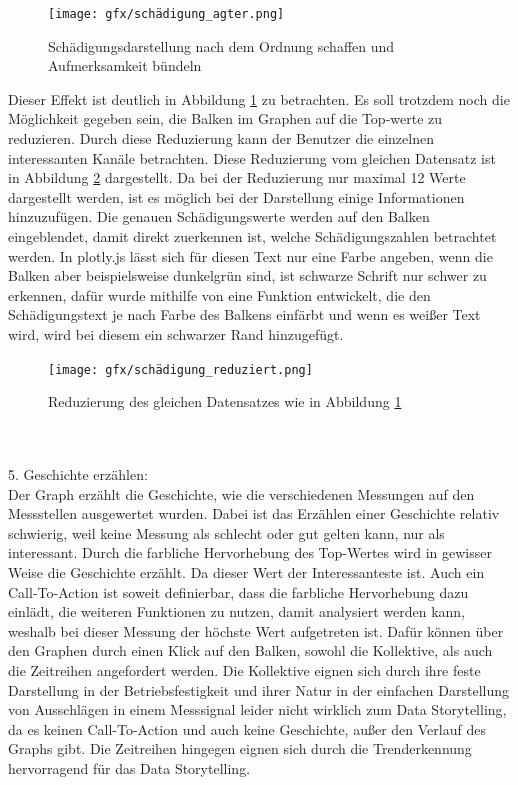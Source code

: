 \begin{figure}[!h]
    \centering
    \texttt{[image: gfx/schädigung\_agter.png]}
    \caption{Schädigungsdarstellung nach dem Ordnung schaffen und Aufmerksamkeit bündeln}
    \label{fig:schaedigung_after}
\end{figure}
\noindent
Dieser Effekt ist deutlich in Abbildung \ref{fig:schaedigung_after} zu betrachten. Es soll trotzdem noch die Möglichkeit gegeben sein, die Balken im Graphen auf die Top-werte zu reduzieren. Durch diese Reduzierung kann der Benutzer die einzelnen interessanten Kanäle betrachten. Diese Reduzierung vom gleichen Datensatz ist in Abbildung \ref{fig:schädigung_reduziert} dargestellt. Da bei der Reduzierung nur maximal 12 Werte dargestellt werden, ist es möglich bei der Darstellung einige Informationen hinzuzufügen. Die genauen Schädigungswerte werden auf den Balken eingeblendet, damit direkt zuerkennen ist, welche Schädigungszahlen betrachtet werden. In plotly.js lässt sich für diesen Text nur eine Farbe angeben, wenn die Balken aber beispielsweise dunkelgrün sind, ist schwarze Schrift nur schwer zu erkennen, dafür wurde mithilfe von \cite{Alnitak.2012} eine Funktion entwickelt, die den Schädigungstext je nach Farbe des Balkens einfärbt und wenn es weißer Text wird, wird bei diesem ein schwarzer Rand hinzugefügt.
\begin{figure}[!h]
    \centering
    \texttt{[image: gfx/schädigung\_reduziert.png]}
    \caption{Reduzierung des gleichen Datensatzes wie in Abbildung \ref{fig:schaedigung_after}}
    \label{fig:schädigung_reduziert}
\end{figure}
\\\\5. Geschichte erzählen:\\
Der Graph erzählt die Geschichte, wie die verschiedenen Messungen auf den Messstellen ausgewertet wurden. Dabei ist das Erzählen einer Geschichte relativ schwierig, weil keine Messung als schlecht oder gut gelten kann, nur als interessant. Durch die farbliche Hervorhebung des Top-Wertes wird in gewisser Weise die Geschichte erzählt. Da dieser Wert der Interessanteste ist. Auch ein Call-To-Action ist soweit definierbar, dass die farbliche Hervorhebung dazu einlädt, die weiteren Funktionen zu nutzen, damit analysiert werden kann, weshalb bei dieser Messung der höchste Wert aufgetreten ist. Dafür können über den Graphen durch einen Klick auf den Balken, sowohl die Kollektive, als auch die Zeitreihen angefordert werden. Die Kollektive eignen sich durch ihre feste Darstellung in der Betriebsfestigkeit \cite{Gotz.2020} und ihrer Natur in der einfachen Darstellung von Ausschlägen in einem Messsignal \cite{PatrickPfeiffer.17.10.2022}  leider nicht wirklich zum Data Storytelling, da es keinen Call-To-Action und auch keine Geschichte, außer den Verlauf des Graphs gibt. Die Zeitreihen hingegen eignen sich durch die Trenderkennung hervorragend für das Data Storytelling.
